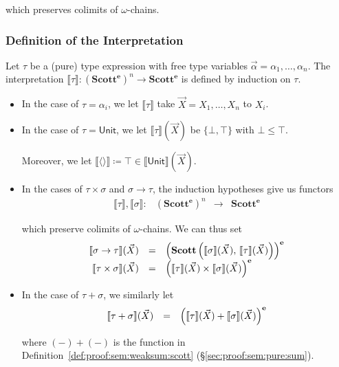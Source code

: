 \documentclass[%
  a4paper,
  UKenglish,
  cleveref,
  autoref,
  thm-restate,
  numberwithinsect,
]{lipics-v2021}
\newcommand\longto\longrightarrow
\newcommand\deq\coloneqq
\newcommand\pl{\mathord{-}}	%
\newcommand\pair[1]{{\langle #1\rangle}}
\newcommand\I[1]{\llbracket #1 \rrbracket} %
\newcommand\Scott{\mathbf{Scott}}
\newcommand\term[1]{\mathsf{#1}}
\newcommand\type[1]{\term{#1}}
\newcommand\arrow\to
\newcommand\Unit{\type{Unit}}
\newcommand\TV{\alpha}		%
\newcommand\PT{\tau}		%
\newcommand\PTbis{\sigma}	%
\newcommand\ep{{\mathbf{e}}}
\begin{document}
\noindent
which preserves colimits of $\omega$-chains.


\subsubsection{Definition of the Interpretation}
\label{sec:proof:sem:pure:intdef}

Let $\PT$ be a (pure) type expression with free
type variables $\vec \TV = \TV_1,\dots,\TV_n$.
The interpretation $\I\PT \colon \left(\Scott^\ep\right)^n \to \Scott^\ep$
is defined by induction on $\PT$.
\begin{itemize}
\item
In the case of $\PT = \TV_i$,
we let $\I\PT$ take $\vec X = X_1,\dots,X_n$ to $X_i$.

\item
In the case of $\PT = \Unit$,
we let $\I\PT(\vec X)$ be $\{\bot, \top\}$ with $\bot \leq \top$.

Moreover,
we let $\I{\pair{}} \deq \top \in \I\Unit(\vec X)$.


\item
In the cases of $\PT \times \PTbis$
and $\PTbis \arrow \PT$,
the induction hypotheses give us
functors
\[
\begin{array}{*{4}{l}}
  \I\PT, \I\PTbis
  \colon
& \left( \Scott^\ep \right)^{n}
& \longto
& \Scott^\ep
\end{array}
\]

\noindent
which preserve colimits of $\omega$-chains.
We can thus set
\[
\begin{array}{r c l}
  \I{\PTbis \arrow \PT}(\vec X)
& =
& \left( \Scott \left( \I{\PTbis}(\vec X) ,\, \I{\PT}(\vec X) \right) \right)^\ep
\\
%
  \I{\PT \times \PTbis}(\vec X)
& =
& \left(
  \I\PT(\vec X) \times \I\PTbis(\vec X)
  \right)^\ep
\end{array}
\]

\item
In the case of $\PT + \PTbis$,
we similarly let 
\[
\begin{array}{r c l}
  \I{\PT + \PTbis}(\vec X)
& =
& \left(
  \I\PT(\vec X) + \I\PTbis(\vec X)
  \right)^\ep
\end{array}
\]

\noindent
where $(\pl) + (\pl)$ is the function in Definition~\ref{def:proof:sem:weaksum:scott}
(\S\ref{sec:proof:sem:pure:sum}).


\end{itemize}
\end{document}
